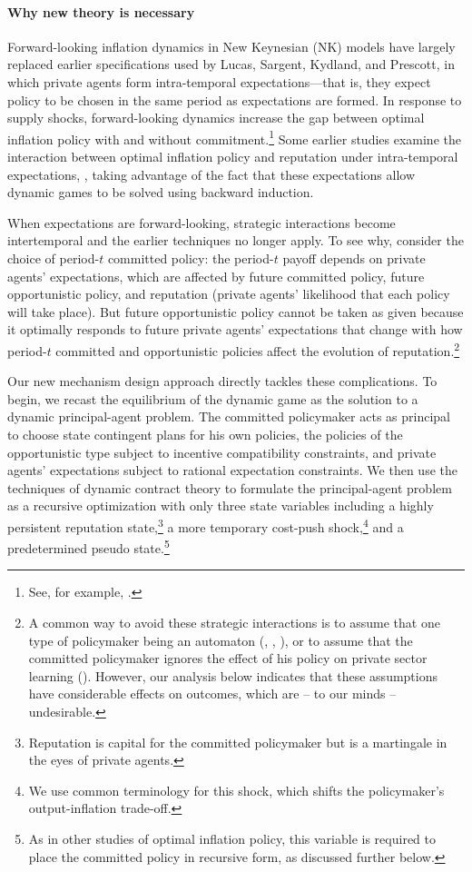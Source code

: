 \documentclass[12pt,letter,leqno]{article}
\theoremstyle{asn}
\theoremstyle{lem}
\theoremstyle{slem}
\theoremstyle{prop}
\theoremstyle{appprop}
\theoremstyle{rem}
\theoremstyle{defn}
\begin{document}
\paragraph{Why new theory is necessary} 
Forward-looking inflation dynamics in New Keynesian (NK) models have largely replaced earlier specifications used by Lucas, Sargent, Kydland, and Prescott, in which private agents form intra-temporal expectations—that is, they expect policy to be chosen in the same period as expectations are formed. In response to supply shocks, forward-looking dynamics increase the gap between optimal inflation policy with and without commitment.\footnote{See, for example, \cite{clarida_science_1999}.} Some earlier studies examine the interaction between optimal inflation policy and reputation under intra-temporal expectations, \cite{cukierman_optimal_1991, king_managing_2008, lu_optimal_2013, Dovis_2021}, taking advantage of the fact that these expectations allow dynamic games to be solved using backward induction.

When expectations are forward-looking, strategic interactions become intertemporal and the earlier techniques no longer apply. To see why, consider the choice of period-$t$ committed policy: the period-$t$ payoff depends on private agents' expectations, which are affected by future committed policy, future opportunistic policy, and reputation (private agents' likelihood that each policy will take place). But future opportunistic policy cannot be taken as given because it optimally responds to future private agents' expectations that change with how period-$t$ committed and opportunistic policies affect the evolution of reputation.\footnote{A common way to avoid these strategic interactions is to assume that one type of policymaker being an automaton (\cite{lu_optimal_2016}, \cite{amador_reputation_2021}, \cite{morelli_information_2023}), or to assume that the committed policymaker ignores the effect of his policy on private sector learning (\cite{clayton_internationalizing_2025}). However, our analysis below indicates that these assumptions have considerable effects on outcomes, which are -- to our minds -- undesirable.}

Our new mechanism design approach directly tackles these complications. To begin, we recast the equilibrium of the dynamic game as the solution to a dynamic principal-agent problem. The committed policymaker acts as principal to choose state contingent plans for his own policies, the policies of the opportunistic type subject to incentive compatibility constraints, and private agents' expectations subject to rational expectation constraints. We then use the techniques of dynamic contract theory to formulate the principal-agent problem as a recursive optimization with only three state variables including a highly persistent reputation state,\footnote{Reputation is capital for the committed policymaker but is a martingale in the eyes of private agents.} a more temporary cost-push shock,\footnote{We use common terminology for this shock, which shifts the policymaker's output-inflation trade-off.} and a predetermined pseudo state.\footnote{As in other studies of optimal inflation policy, this variable is required to place the committed policy in recursive form, as discussed further below.}
\end{document}
